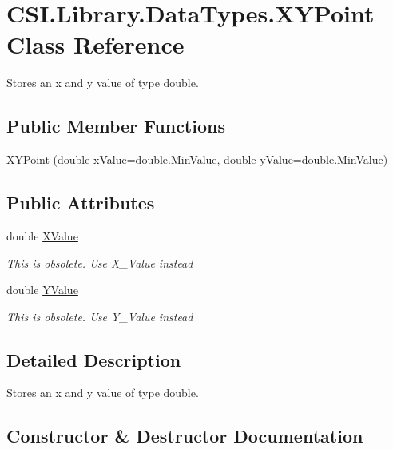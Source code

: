 \hypertarget{class_c_s_i_1_1_library_1_1_data_types_1_1_x_y_point}{}\section{C\+S\+I.\+Library.\+Data\+Types.\+X\+Y\+Point Class Reference}
\label{class_c_s_i_1_1_library_1_1_data_types_1_1_x_y_point}


Stores an x and y value of type double.  


\subsection*{Public Member Functions}
\begin{DoxyCompactItemize}
\item 
\mbox{\hyperlink{class_c_s_i_1_1_library_1_1_data_types_1_1_x_y_point_a04536594c9c2d2e0df760161f91068b2}{X\+Y\+Point}} (double x\+Value=double.\+Min\+Value, double y\+Value=double.\+Min\+Value)
\end{DoxyCompactItemize}
\subsection*{Public Attributes}
\begin{DoxyCompactItemize}
\item 
double \mbox{\hyperlink{class_c_s_i_1_1_library_1_1_data_types_1_1_x_y_point_a792f920b008e692ea4809d6ed22e0434}{X\+Value}}
\begin{DoxyCompactList}\small\item\em This is obsolete. Use X\+\_\+\+Value instead \end{DoxyCompactList}\item 
double \mbox{\hyperlink{class_c_s_i_1_1_library_1_1_data_types_1_1_x_y_point_a06e6e4193710b6809507bb1746b84e43}{Y\+Value}}
\begin{DoxyCompactList}\small\item\em This is obsolete. Use Y\+\_\+\+Value instead \end{DoxyCompactList}\end{DoxyCompactItemize}


\subsection{Detailed Description}
Stores an x and y value of type double. 



\subsection{Constructor \& Destructor Documentation}
\mbox{\label{class_c_s_i_1_1_library_1_1_data_types_1_1_x_y_point_a04536594c9c2d2e0df760161f91068b2}} 
